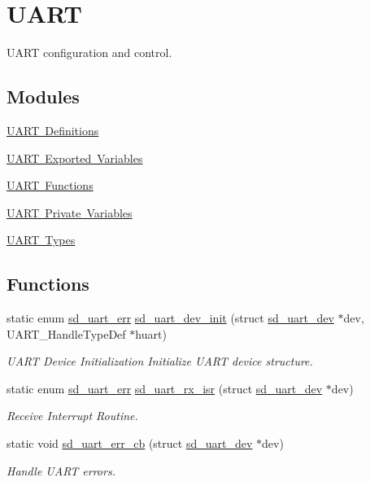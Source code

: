 \hypertarget{group___s_d___u_a_r_t}{}\section{U\+A\+RT}
\label{group___s_d___u_a_r_t}


U\+A\+RT configuration and control.  


\subsection*{Modules}
\begin{DoxyCompactItemize}
\item 
\mbox{\hyperlink{group___s_d___u_a_r_t___defines}{U\+A\+R\+T Definitions}}
\item 
\mbox{\hyperlink{group___s_d___u_a_r_t___exported___variables}{U\+A\+R\+T Exported Variables}}
\item 
\mbox{\hyperlink{group___s_d___u_a_r_t___functions}{U\+A\+R\+T Functions}}
\item 
\mbox{\hyperlink{group___s_d___u_a_r_t___private___variables}{U\+A\+R\+T Private Variables}}
\item 
\mbox{\hyperlink{group___s_d___u_a_r_t___types}{U\+A\+R\+T Types}}
\end{DoxyCompactItemize}
\subsection*{Functions}
\begin{DoxyCompactItemize}
\item 
static enum \mbox{\hyperlink{group___s_d___u_a_r_t___types_gaff649a266fb34035c10733370c4fd104}{sd\+\_\+uart\+\_\+err}} \mbox{\hyperlink{group___s_d___u_a_r_t_ga67a7e880d3ca7aa4f2a2987e3cbd9a15}{sd\+\_\+uart\+\_\+dev\+\_\+init}} (struct \mbox{\hyperlink{structsd__uart__dev}{sd\+\_\+uart\+\_\+dev}} $\ast$dev, U\+A\+R\+T\+\_\+\+Handle\+Type\+Def $\ast$huart)
\begin{DoxyCompactList}\small\item\em U\+A\+RT Device Initialization Initialize U\+A\+RT device structure. \end{DoxyCompactList}\item 
static enum \mbox{\hyperlink{group___s_d___u_a_r_t___types_gaff649a266fb34035c10733370c4fd104}{sd\+\_\+uart\+\_\+err}} \mbox{\hyperlink{group___s_d___u_a_r_t_ga54b5b3ca4f31885d84714a36f6fcc5e3}{sd\+\_\+uart\+\_\+rx\+\_\+isr}} (struct \mbox{\hyperlink{structsd__uart__dev}{sd\+\_\+uart\+\_\+dev}} $\ast$dev)
\begin{DoxyCompactList}\small\item\em Receive Interrupt Routine. \end{DoxyCompactList}\item 
static void \mbox{\hyperlink{group___s_d___u_a_r_t_gafc595787c83c748d767ac49596be144e}{sd\+\_\+uart\+\_\+err\+\_\+cb}} (struct \mbox{\hyperlink{structsd__uart__dev}{sd\+\_\+uart\+\_\+dev}} $\ast$dev)
\begin{DoxyCompactList}\small\item\em Handle U\+A\+RT errors. \end{DoxyCompactList}\end{DoxyCompactItemize}


